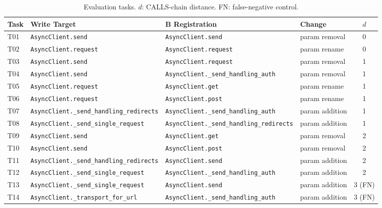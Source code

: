 \documentclass[12pt]{article}
\begin{document}
\begin{table}[ht]
\centering
\caption{Evaluation tasks. $d$: CALLS-chain distance. FN: false-negative control.}
\label{tab:tasks}
\small
\renewcommand{\arraystretch}{1.2}
\begin{tabular}{@{}llllc@{}}
\toprule
\textbf{Task} & \textbf{Write Target} & \textbf{B Registration}
              & \textbf{Change} & \textbf{$d$} \\
\midrule
T01 & \texttt{AsyncClient.send}         & \texttt{AsyncClient.send}         & param removal  & 0 \\
T02 & \texttt{AsyncClient.request}      & \texttt{AsyncClient.request}      & param rename   & 0 \\
\midrule
T03 & \texttt{AsyncClient.send}         & \texttt{AsyncClient.request}      & param removal  & 1 \\
T04 & \texttt{AsyncClient.send}         & \texttt{AsyncClient.\_send\_handling\_auth} & param removal & 1 \\
T05 & \texttt{AsyncClient.request}      & \texttt{AsyncClient.get}          & param rename   & 1 \\
T06 & \texttt{AsyncClient.request}      & \texttt{AsyncClient.post}         & param rename   & 1 \\
T07 & \texttt{AsyncClient.\_send\_handling\_redirects} & \texttt{AsyncClient.\_send\_handling\_auth} & param addition & 1 \\
T08 & \texttt{AsyncClient.\_send\_single\_request} & \texttt{AsyncClient.\_send\_handling\_redirects} & param addition & 1 \\
\midrule
T09 & \texttt{AsyncClient.send}         & \texttt{AsyncClient.get}          & param removal  & 2 \\
T10 & \texttt{AsyncClient.send}         & \texttt{AsyncClient.post}         & param removal  & 2 \\
T11 & \texttt{AsyncClient.\_send\_handling\_redirects} & \texttt{AsyncClient.send} & param addition & 2 \\
T12 & \texttt{AsyncClient.\_send\_single\_request} & \texttt{AsyncClient.\_send\_handling\_auth} & param addition & 2 \\
\midrule
T13 & \texttt{AsyncClient.\_send\_single\_request} & \texttt{AsyncClient.send}   & param addition & 3 (FN) \\
T14 & \texttt{AsyncClient.\_transport\_for\_url}   & \texttt{AsyncClient.\_send\_handling\_auth} & param addition & 3 (FN) \\
\bottomrule
\end{tabular}
\end{table}
\end{document}
